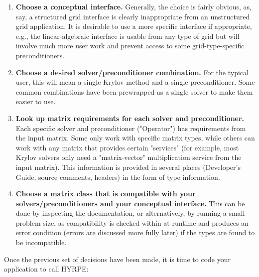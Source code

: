 \begin{enumerate}

\item
{\bf Choose a conceptual interface.} Generally, the choice is fairly obvious, as,
say, a structured grid 
interface is clearly inappropriate from an unstructured grid application. It is
desirable to use a more 
specific interface if appropriate, e.g., the linear-algebraic interface is
usable from any type of grid but 
will involve much more user work and prevent access to some grid-type-specific
preconditioners.

\item 
{\bf Choose a desired solver/preconditioner combination.} For the typical user,
this will mean a single 
Krylov method and a single preconditioner. Some common combinations have been
prewrapped as a 
single solver to make them easier to use. 

\item 
{\bf Look up matrix requirements for each solver and preconditioner.} Each
specific solver and 
preconditioner ("Operator") has requirements from the input matrix. Some only
work with specific 
matrix types, while others can work with any matrix that provides certain
"services" (for example, 
most Krylov solvers only need a "matrix-vector" multiplication service from the
input matrix). This 
information is provided in several places (Developer's Guide, source comments,
headers) in the form 
of type information.

\item 
{\bf Choose a matrix class that is compatible with your solvers/preconditioners and your
conceptual 
interface.} This can be done by inspecting the documentation, or alternatively,
by running a small 
problem size, as compatibility is checked within \hypre{} at runtime and produces
an error condition 
(errors are discussed more fully later) if the types are found to be
incompatible.

\end{enumerate}

Once the previous set of decisions have been made, it is time to code your application 
to call HYRPE:

